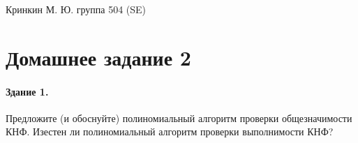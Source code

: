 \documentclass[a4paper,12pt]{article}
\begin{document}
\sloppy

\lstset{
	basicstyle=\small,
	stringstyle=\ttfamily,
	showstringspaces=false,
	columns=fixed,
	breaklines=true,
	numbers=right,
	numberstyle=\tiny
}

\newtheorem{Def}{Определение}[section]
\newtheorem{Th}{Теорема}
\newtheorem{Lem}[Th]{Лемма}
\newenvironment{Proof}
	{\par\noindent{\bf Доказательство.}}
	{\hfill$\scriptstyle\blacksquare$}
\newenvironment{Solution}
	{\par\noindent{\bf Решение.}}
	{\hfill$\scriptstyle\blacksquare$}


\begin{flushright}
	Кринкин М. Ю. группа 504 (SE)
\end{flushright}

\section{Домашнее задание 2}

\paragraph{Здание 1.} Предложите (и обоснуйте) полиномиальный алгоритм проверки общезначимости КНФ. Изестен ли полиномиальный алгоритм проверки выполнимости КНФ?
\end{document}

